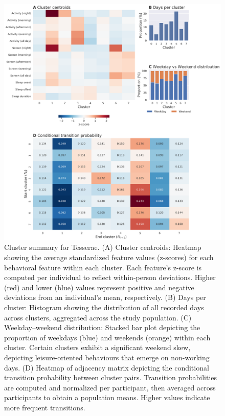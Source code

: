 \documentclass[pdflatex,sn-vancouver,Numbered]{bst/sn-jnl}%
\theoremstyle{thmstyleone}%
\theoremstyle{thmstyletwo}%
\theoremstyle{thmstylethree}%
\begin{document}
\begin{figure}[htbp!]
    \centering
    \includegraphics[width=1\linewidth]{figures/tesserae_summary.png}
    \caption{Cluster summary for Tesserae. (A) Cluster centroids: Heatmap showing the average standardized feature values (z-scores) for each behavioral feature within each cluster. Each feature’s z-score is computed per individual to reflect within-person deviations. Higher (red) and lower (blue) values represent positive and negative deviations from an individual’s mean, respectively. (B) Days per cluster: Histogram showing the distribution of all recorded days across clusters, aggregated across the study population. (C) Weekday–weekend distribution: Stacked bar plot depicting the proportion of weekdays (blue) and weekends (orange) within each cluster. Certain clusters exhibit a significant weekend skew, depicting leisure-oriented behaviours that emerge on non-working days. (D) Heatmap of adjacency matrix depicting the conditional transition probability between cluster pairs. Transition probabilities are computed and normalized per participant, then averaged across participants to obtain a population means. Higher values indicate more frequent transitions.}
    \label{fig:tesserae-cluster-summary}
\end{figure}
\end{document}
